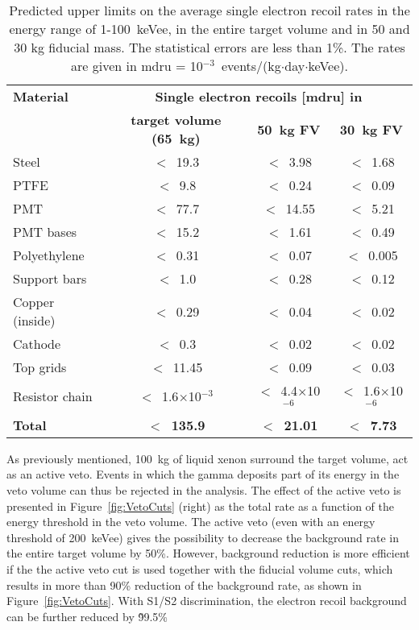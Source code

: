 \begin{table}[!h]
\centering
\caption{Predicted upper limits on the average single electron recoil rates in the energy range of 1-100~keVee, in the entire target volume and in 50 and 30 kg fiducial mass. The
statistical errors are less than 1\%. The rates are given in mdru = 10$^{-3}$~events/(kg$\cdot$day$\cdot$keVee).}
\label{tab:gamma-rates}
\vspace{0.3cm}
\begin{tabular}{lccc}
\hline
\bf{Material} & \multicolumn{3}{c}{\bf{Single electron recoils [mdru] in}}\\
         	      & \bf{target volume (65~kg)} & \bf{50~kg FV} & \bf{30~kg FV} \\
\hline
Steel & $<$~19.3 & $<$~3.98 &  $<$~1.68\\
PTFE & $<$~9.8 & $<$~0.24 &  $<$~0.09\\
PMT & $<$~77.7 & $<$~14.55 & $<$~5.21 \\
PMT bases & $<$~15.2 & $<$~1.61 & $<$~0.49 \\
Polyethylene & $<$~0.31 & $<$~0.07 & $<$~0.005\\
Support bars & $<$~1.0 & $<$~0.28 & $<$~0.12 \\
Copper (inside) & $<$~0.29 & $<$~0.04 & $<$~0.02 \\
Cathode & $<$~0.3 & $<$~0.02 & $<$~0.02\\
Top grids & $<$~11.45 &$<$~0.09 & $<$~0.03\\
Resistor chain & $<$~1.6$\times$10$^{-3}$ & $<$~4.4$\times$10$^{-6}$ & $<$~1.6$\times$10$^{-6}$ \\
\hline
\bf{Total} &  \bf{$<$~135.9} &  \bf{$<$~21.01} & \bf{$<$~7.73}\\
\hline
\end{tabular}
\end{table}


As previously mentioned, 100~kg of liquid xenon surround the target volume, act as an active veto. Events in which the gamma deposits part of 
its energy in the veto volume can thus be rejected in the analysis. 
The effect of the active veto is presented in Figure~\ref{fig:VetoCuts} (right) as the total rate as a function
of the energy threshold in the veto volume.
The active veto (even with an energy threshold of 200~keVee) gives the possibility to decrease 
the background rate in the entire target volume by 50\%. However, background reduction is more efficient if the the active veto cut is used together with the fiducial 
volume cuts, which results in more than 90\% reduction of the background rate, as shown in Figure~\ref{fig:VetoCuts}. With S1/S2 discrimination, the electron recoil background can be further reduced by \~99.5\%


